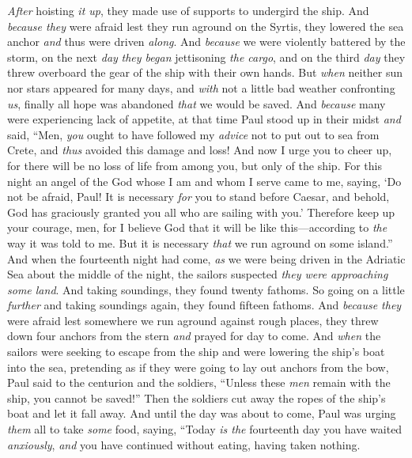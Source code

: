 \begin{biblechapter}
\verse \textit{After} hoisting \textit{it up}, they made use of supports to undergird the ship. And \textit{because they} were afraid lest they run aground on the Syrtis, they lowered the sea anchor \textit{and} thus were driven \textit{along}.
\verse And \textit{because} we were violently battered by the storm, on the next \textit{day} \textit{they began} jettisoning \textit{the cargo},
\verse and on the third \textit{day} they threw overboard the gear of the ship with their own hands.
\verse But \textit{when} neither sun nor stars appeared for many days, and \textit{with} not a little bad weather confronting \textit{us}, finally all hope was abandoned \textit{that} we would be saved.
\verse And \textit{because} many were experiencing lack of appetite, at that time Paul stood up in their midst \textit{and} said, “Men, \textit{you} ought to have followed my \textit{advice} not to put out to sea from Crete, and \textit{thus} avoided this damage and loss!
\verse And now I urge you to cheer up, for there will be no loss of life from among you, but only of the ship.
\verse For this night an angel of the God whose I am and whom I serve came to me,
\verse saying, ‘Do not be afraid, Paul! It is necessary \textit{for} you to stand before Caesar, and behold, God has graciously granted you all who are sailing with you.’
\verse Therefore keep up your courage, men, for I believe God that it will be like this—according to \textit{the} way it was told to me.
\verse But it is necessary \textit{that} we run aground on some island.”
\verse And when the fourteenth night had come, \textit{as} we were being driven in the Adriatic Sea about the middle of the night, the sailors suspected \textit{they were approaching some land}.
\verse And taking soundings, they found twenty fathoms. So going on a little \textit{further} and taking soundings again, they found fifteen fathoms.
\verse And \textit{because they} were afraid lest somewhere we run aground against rough places, they threw down four anchors from the stern \textit{and} prayed for day to come.
\verse And \textit{when} the sailors were seeking to escape from the ship and were lowering the ship’s boat into the sea, pretending as if they were going to lay out anchors from the bow,
\verse Paul said to the centurion and the soldiers, “Unless these \textit{men} remain with the ship, you cannot be saved!”
\verse Then the soldiers cut away the ropes of the ship’s boat and let it fall away.
\verse And until the day was about to come, Paul was urging \textit{them} all to take \textit{some} food, saying, “Today \textit{is the} fourteenth day you have waited \textit{anxiously}, \textit{and} you have continued without eating, having taken nothing.

\end{biblechapter}
